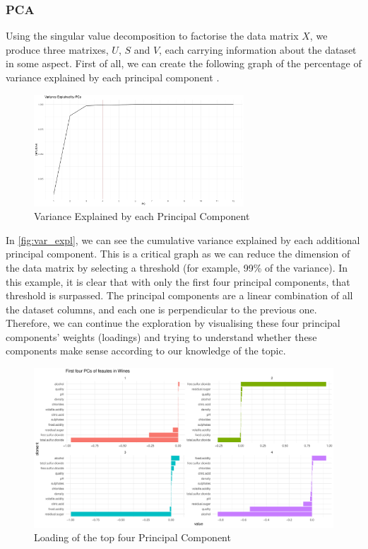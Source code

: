 \documentclass[11pt,twoside]{article}
\numberwithin{Theorem}{section}
\numberwithin{Definition}{section}
\numberwithin{Lemma}{section}
\numberwithin{Algorithm}{section}
\numberwithin{equation}{section}
\begin{document}
\subsubsection{PCA}
\label{sec:pca}
Using the singular value decomposition to factorise the data matrix $X$, we produce three matrixes, $U$, $S$ and $V$, each carrying information about the dataset in some aspect. First of all, we can create the following graph of the percentage of variance explained by each principal component \cite{dme}.
\vspace*{1em}
\begin{figure}[!h]
\centering
\includegraphics[width=0.7\textwidth]{./output/1.a.pca-var-expl.pdf}
\caption{Variance Explained by each Principal Component}
\label{fig:var_expl}
\end{figure}
\vspace{2em}
In \autoref{fig:var_expl}, we can see the cumulative variance explained by each additional principal component. This is a critical graph as we can reduce the dimension of the data matrix by selecting a threshold (for example, 99\% of the variance). In this example, it is clear that with only the first four principal components, that threshold is surpassed.
The principal components are a linear combination of all the dataset columns, and each one is perpendicular to the previous one. Therefore, we can continue the exploration by visualising these four principal components' weights (loadings) and trying to understand whether these components make sense according to our knowledge of the topic.
\vspace*{1em}
\begin{figure}[!h]
\centering
\includegraphics[width=\textwidth]{./output/1.b.pca-features.pdf}
\caption{Loading of the top four Principal Component}
\end{figure}
\end{document}

